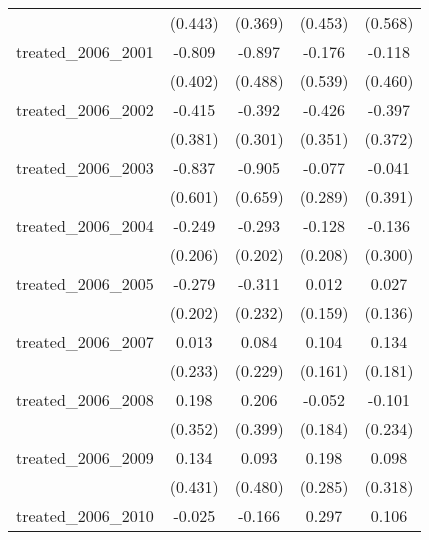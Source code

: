 {\begin{tabular}{l*{4}{c}}
            &     (0.443)         &     (0.369)         &     (0.453)         &     (0.568)         \\
[1em]
treated\_2006\_2001&      -0.809\sym{*}  &      -0.897         &      -0.176         &      -0.118         \\
            &     (0.402)         &     (0.488)         &     (0.539)         &     (0.460)         \\
[1em]
treated\_2006\_2002&      -0.415         &      -0.392         &      -0.426         &      -0.397         \\
            &     (0.381)         &     (0.301)         &     (0.351)         &     (0.372)         \\
[1em]
treated\_2006\_2003&      -0.837         &      -0.905         &      -0.077         &      -0.041         \\
            &     (0.601)         &     (0.659)         &     (0.289)         &     (0.391)         \\
[1em]
treated\_2006\_2004&      -0.249         &      -0.293         &      -0.128         &      -0.136         \\
            &     (0.206)         &     (0.202)         &     (0.208)         &     (0.300)         \\
[1em]
treated\_2006\_2005&      -0.279         &      -0.311         &       0.012         &       0.027         \\
            &     (0.202)         &     (0.232)         &     (0.159)         &     (0.136)         \\
[1em]
treated\_2006\_2007&       0.013         &       0.084         &       0.104         &       0.134         \\
            &     (0.233)         &     (0.229)         &     (0.161)         &     (0.181)         \\
[1em]
treated\_2006\_2008&       0.198         &       0.206         &      -0.052         &      -0.101         \\
            &     (0.352)         &     (0.399)         &     (0.184)         &     (0.234)         \\
[1em]
treated\_2006\_2009&       0.134         &       0.093         &       0.198         &       0.098         \\
            &     (0.431)         &     (0.480)         &     (0.285)         &     (0.318)         \\
[1em]
treated\_2006\_2010&      -0.025         &      -0.166         &       0.297         &       0.106         \\

\end{tabular}}
